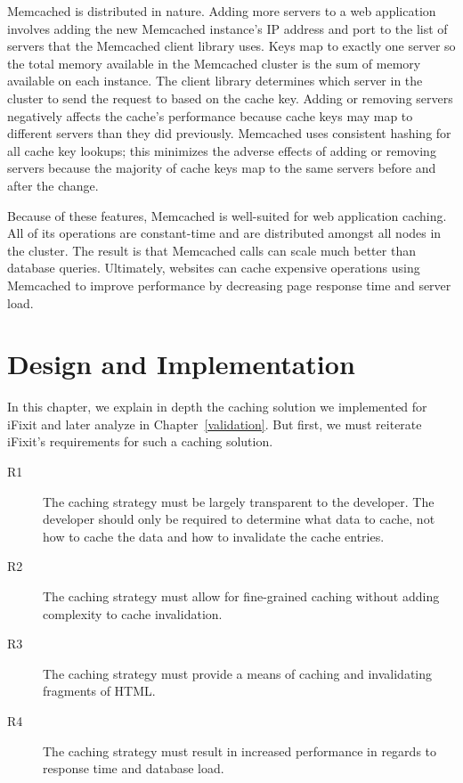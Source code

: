 \documentclass[12pt]{ucthesis}
\begin{document}
\textsf{Memcached} is distributed in nature.
Adding more servers to a web application involves adding the new \textsf{Memcached} instance's IP address and port to the list of servers that the \textsf{Memcached} client library uses.
Keys map to exactly one server so the total memory available in the \textsf{Memcached} cluster is the sum of memory available on each instance.
The client library determines which server in the cluster to send the request to based on the cache key.
Adding or removing servers negatively affects the cache's performance because cache keys may map to different servers than they did previously.
\textsf{Memcached} uses consistent hashing\cite{consistentHashing} for all cache key lookups; this minimizes the adverse effects of adding or removing servers because the majority of cache keys map to the same servers before and after the change.

Because of these features, \textsf{Memcached} is well-suited for web application caching.
All of its operations are constant-time and are distributed amongst all nodes in the cluster.
The result is that \textsf{Memcached} calls can scale much better than database queries.
Ultimately, websites can cache expensive operations using \textsf{Memcached} to improve performance by decreasing page response time and server load.


\chapter{Design and Implementation} \label{designAndImplementation}
In this chapter, we explain in depth the caching solution we implemented for \textsf{iFixit} and later analyze in Chapter~\ref{validation}.
But first, we must reiterate \textsf{iFixit}'s requirements for such a caching solution.

\begin{description}
   \item[R1] The caching strategy must be largely transparent to the developer.
             The developer should only be required to determine what data to cache, not how to cache the data and how to invalidate the cache entries.
   \item[R2] The caching strategy must allow for fine-grained caching without adding complexity to cache invalidation.
   \item[R3] The caching strategy must provide a means of caching and invalidating fragments of HTML\@.
   \item[R4] The caching strategy must result in increased performance in regards to response time and database load.
\end{description}
\end{document}
